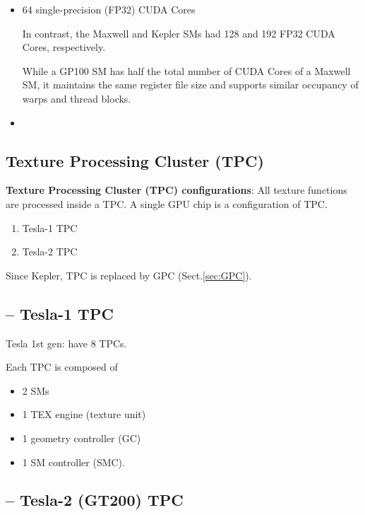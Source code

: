 \begin{itemize}
  \item   64 single-precision (FP32) CUDA Cores

 In contrast, the Maxwell and Kepler SMs had 128 and 192 FP32 CUDA Cores,
 respectively.
 
 While a GP100 SM has half the total number of CUDA Cores of a Maxwell SM, it
 maintains the same register file size and supports similar occupancy of warps
 and thread blocks.

  
  \item 
\end{itemize}

\subsection{Texture Processing Cluster (TPC)}
\label{sec:TPC-TextureProcessingCluster}


{\bf Texture Processing Cluster (TPC) configurations}: All texture functions are
processed inside a TPC. A single GPU chip is a configuration of TPC.
\begin{enumerate}
  \item Tesla-1 TPC
  \item Tesla-2 TPC
\end{enumerate}

Since Kepler, TPC is replaced by GPC (Sect.\ref{sec:GPC}).


\subsection{-- Tesla-1 TPC}

Tesla 1st gen:     have 8 TPCs.

Each TPC is composed of 
\begin{itemize}
  \item 2 SMs 
  
  \item 1 TEX engine (texture unit) 
  
  \item 1 geometry controller (GC) 

  \item 1 SM controller (SMC). 
\end{itemize}


\subsection{-- Tesla-2 (GT200) TPC}

